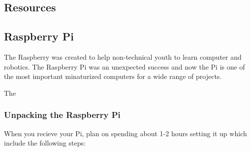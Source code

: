 \documentclass{article}\usepackage[]{graphicx}\usepackage[]{color}
\begin{document}
\subsection{Resources}

\subsection{Raspberry Pi}

The Raspberry was created to help non-technical youth to learn computer and robotics. The Raspberry Pi was an unexpected success and now the Pi is one of the most important minaturized computers for a wide range of projects.  

The %

\subsubsection{Unpacking the Raspberry Pi}

When you recieve your Pi, plan on spending about 1-2 hours setting it up which include the following steps:
\end{document}
